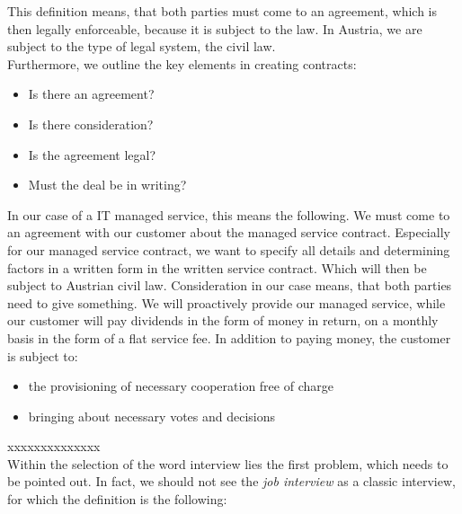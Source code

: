 \noindent This definition means, that both parties must come to an agreement, which is then 
legally enforceable, because it is subject to the law. In Austria, we are subject to the
type of legal system, the civil law. \\

\noindent Furthermore, we outline the key elements in creating contracts:

\begin{center}
	\begin{itemize}
		\item Is there an agreement?
		\item Is there consideration?
		\item Is the agreement legal?
		\item Must the deal be in writing?
	\end{itemize}
\end{center}

\noindent In our case of a IT managed service, this means the following. 
We must come to an agreement with our customer about the managed service contract.
Especially for our managed service contract, we want to specify all details and
determining factors in a written form in the written service contract. Which will then
be subject to Austrian civil law. Consideration in our case means, that
both parties need to give something. We will proactively provide our managed service,
while our customer will pay dividends in the form of money in return, 
on a monthly basis in the form of a flat service fee. In addition to paying money,
the customer is subject to:

\begin{center}
	\begin{itemize}
		\item the provisioning of necessary cooperation free of charge
		\item bringing about necessary votes and decisions
	\end{itemize}
\end{center}









xxxxxxxxxxxxxx \\

\noindent Within the selection of the word interview lies the first problem, which needs
to be pointed out. In fact, we should not see the
\emph{job interview} as a classic interview, for which the definition
is the following: \\

